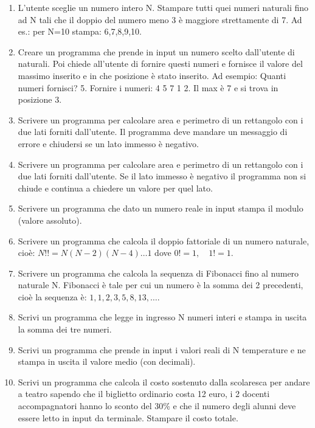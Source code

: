 \documentclass{article}
\begin{document}
\begin{enumerate}
\item L’utente sceglie un numero intero N. Stampare tutti quei numeri naturali fino ad N tali che il doppio del numero meno 3 è maggiore strettamente di 7. Ad es.: per N=10 stampa: 6,7,8,9,10.

\item Creare un programma che prende in input un numero scelto dall'utente di naturali. Poi chiede all'utente di fornire questi numeri e fornisce il valore del massimo inserito e in che posizione è stato inserito. Ad esempio: Quanti numeri fornisci? 5. Fornire i numeri: 4 5 7 1 2. Il max è 7 e si trova in posizione 3.

\item Scrivere un programma per calcolare area e perimetro di un rettangolo con i due lati forniti dall'utente. Il programma deve mandare un messaggio di errore e chiudersi se un lato immesso è negativo.

\item Scrivere un programma per calcolare area e perimetro di un rettangolo con i due lati forniti dall'utente. Se il lato immesso è negativo il programma non si chiude e continua a chiedere un valore per quel lato.

\item Scrivere un programma che dato un numero reale in input stampa il modulo (valore assoluto).

\item Scrivere un programma che calcola il doppio fattoriale di un numero naturale, cioè: $N!! = N(N-2)(N-4)\ldots 1$ dove $0! = 1, \quad 1! = 1.$

\item Scrivere un programma che calcola la sequenza di Fibonacci fino al numero naturale N. Fibonacci è tale per cui un numero è la somma dei 2 precedenti, cioè la sequenza è: $1, 1, 2, 3, 5, 8, 13, \ldots$.

\item Scrivi un programma che legge in ingresso N numeri interi e stampa in uscita la somma dei tre numeri.

\item Scrivi un programma che prende in input i valori reali di N temperature e ne stampa in uscita il valore medio (con decimali).

\item Scrivi un programma che calcola il costo sostenuto dalla scolaresca per andare a teatro sapendo che il biglietto ordinario costa 12 euro, i 2 docenti accompagnatori hanno lo sconto del 30\% e che il numero degli alunni deve essere letto in input da terminale. Stampare il costo totale.


\end{enumerate}
\end{document}
